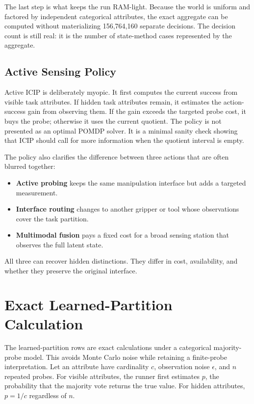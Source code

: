 \documentclass{article}
\newcommand{\icip}{\textsc{ICIP}}
\begin{document}
The last step is what keeps the run RAM-light.
Because the world is uniform and factored by independent categorical attributes, the exact aggregate can be computed without materializing 156,764,160 separate decisions.
The decision count is still real: it is the number of state-method cases represented by the aggregate.

\subsection{Active Sensing Policy}

Active \icip{} is deliberately myopic.
It first computes the current success from visible task attributes.
If hidden task attributes remain, it estimates the action-success gain from observing them.
If the gain exceeds the targeted probe cost, it buys the probe; otherwise it uses the current quotient.
The policy is not presented as an optimal POMDP solver.
It is a minimal sanity check showing that \icip{} should call for more information when the quotient interval is empty.

The policy also clarifies the difference between three actions that are often blurred together:
\begin{itemize}
    \item \textbf{Active probing} keeps the same manipulation interface but adds a targeted measurement.
    \item \textbf{Interface routing} changes to another gripper or tool whose observations cover the task partition.
    \item \textbf{Multimodal fusion} pays a fixed cost for a broad sensing station that observes the full latent state.
\end{itemize}
All three can recover hidden distinctions.
They differ in cost, availability, and whether they preserve the original interface.

\section{Exact Learned-Partition Calculation}

The learned-partition rows are exact calculations under a categorical majority-probe model.
This avoids Monte Carlo noise while retaining a finite-probe interpretation.
Let an attribute have cardinality $c$, observation noise $\epsilon$, and $n$ repeated probes.
For visible attributes, the runner first estimates $p$, the probability that the majority vote returns the true value.
For hidden attributes, $p=1/c$ regardless of $n$.
\end{document}
